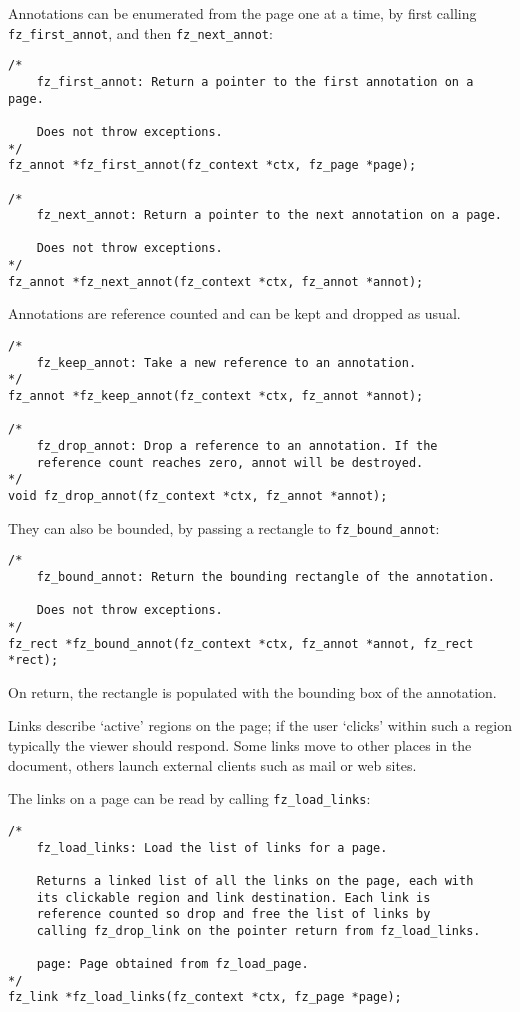 \documentclass[oneside]{book}
\begin{document}
Annotations can be enumerated from the page one at a time, by first calling \texttt{fz\_first\_annot}, and then \texttt{fz\_next\_annot}:

\begin{lstlisting}
/*
	fz_first_annot: Return a pointer to the first annotation on a page.

	Does not throw exceptions.
*/
fz_annot *fz_first_annot(fz_context *ctx, fz_page *page);

/*
	fz_next_annot: Return a pointer to the next annotation on a page.

	Does not throw exceptions.
*/
fz_annot *fz_next_annot(fz_context *ctx, fz_annot *annot);
\end{lstlisting}

Annotations are reference counted and can be kept and dropped as usual.

\begin{lstlisting}
/*
	fz_keep_annot: Take a new reference to an annotation.
*/
fz_annot *fz_keep_annot(fz_context *ctx, fz_annot *annot);

/*
	fz_drop_annot: Drop a reference to an annotation. If the
	reference count reaches zero, annot will be destroyed.
*/
void fz_drop_annot(fz_context *ctx, fz_annot *annot);
\end{lstlisting}


They can also be bounded, by passing a rectangle to \texttt{fz\_bound\_annot}:

\begin{lstlisting}
/*
	fz_bound_annot: Return the bounding rectangle of the annotation.

	Does not throw exceptions.
*/
fz_rect *fz_bound_annot(fz_context *ctx, fz_annot *annot, fz_rect *rect);
\end{lstlisting}

On return, the rectangle is populated with the bounding box of the annotation.

Links describe `active' regions on the page; if the user `clicks' within such a region typically the viewer should respond. Some links move to other places in the document, others launch external clients such as mail or web sites.

The links on a page can be read by calling \texttt{fz\_load\_links}:

\begin{lstlisting}
/*
	fz_load_links: Load the list of links for a page.

	Returns a linked list of all the links on the page, each with
	its clickable region and link destination. Each link is
	reference counted so drop and free the list of links by
	calling fz_drop_link on the pointer return from fz_load_links.

	page: Page obtained from fz_load_page.
*/
fz_link *fz_load_links(fz_context *ctx, fz_page *page);
\end{lstlisting}
\end{document}
